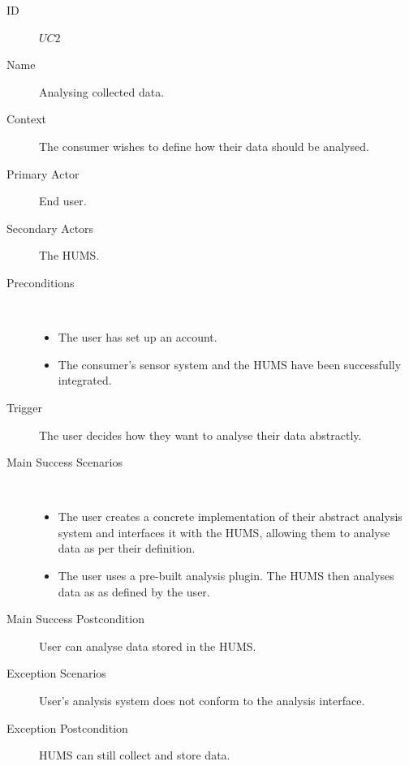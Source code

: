 \documentclass[10pt,a4paper]{article}
\begin{document}
\vspace{\baselineskip}
\begin{description}
	\item[ID] $UC2$
	\item[Name] Analysing collected data.
	\item[Context] The consumer wishes to define how their data should be
	               analysed.
	\item[Primary Actor] End user.
	\item[Secondary Actors] The HUMS.
	\item[Preconditions] ~
			\begin{itemize}
				\item The user has set up an account.
				\item The consumer's sensor system and the HUMS have been
				      successfully integrated.
			\end{itemize}
	\item[Trigger] The user decides how they want to analyse their data
	               abstractly.
	\item[Main Success Scenarios] ~
			\begin{itemize}
				\item The user creates a concrete implementation of their abstract
				      analysis system and interfaces it with the HUMS, allowing them to
				      analyse data as per their definition.
				\item The user uses a pre-built analysis plugin. The HUMS
				      then analyses data as as defined by the user.
			\end{itemize}
	\item[Main Success Postcondition] User can analyse data stored in the HUMS.
	\item[Exception Scenarios] User's analysis system does not conform to the
			analysis interface.
	\item[Exception Postcondition] HUMS can still collect and store data.
\end{description}

\vspace{\baselineskip}
\end{document}

